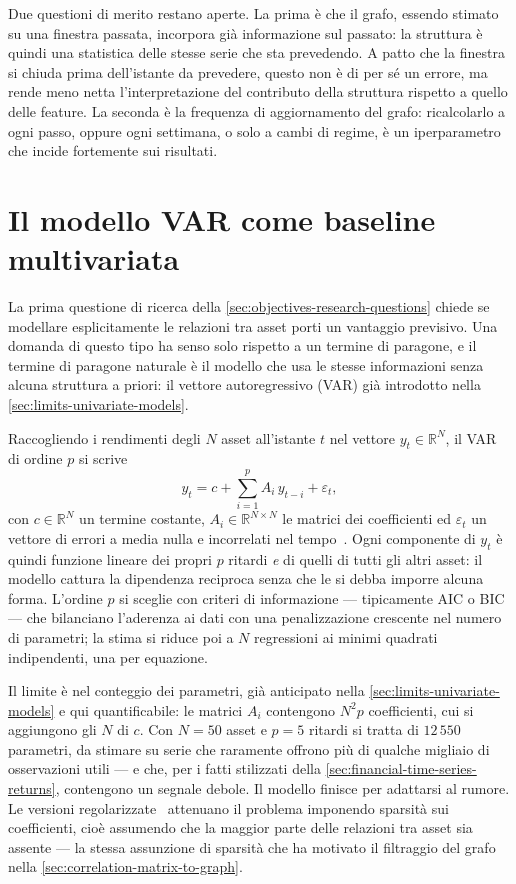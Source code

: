 Due questioni di merito restano aperte. La prima è che il grafo, essendo stimato su una finestra passata, incorpora già informazione sul passato: la struttura è quindi una statistica delle stesse serie che sta prevedendo. A patto che la finestra si chiuda prima dell'istante da prevedere, questo non è di per sé un errore, ma rende meno netta l'interpretazione del contributo della struttura rispetto a quello delle feature. La seconda è la frequenza di aggiornamento del grafo: ricalcolarlo a ogni passo, oppure ogni settimana, o solo a cambi di regime, è un iperparametro che incide fortemente sui risultati.

\section{Il modello VAR come baseline multivariata}
\label{sec:var-baseline}

La prima questione di ricerca della \cref{sec:objectives-research-questions} chiede se modellare esplicitamente le relazioni tra asset porti un vantaggio previsivo. Una domanda di questo tipo ha senso solo rispetto a un termine di paragone, e il termine di paragone naturale è il modello che usa le stesse informazioni senza alcuna struttura a priori: il vettore autoregressivo (VAR) già introdotto nella \cref{sec:limits-univariate-models}.

Raccogliendo i rendimenti degli $N$ asset all'istante $t$ nel vettore $y_t\in\mathbb{R}^N$, il VAR di ordine $p$ si scrive
\begin{equation}
\label{eq:var}
y_t = c + \sum_{i=1}^{p} A_i\,y_{t-i} + \varepsilon_t,
\end{equation}
con $c\in\mathbb{R}^N$ un termine costante, $A_i\in\mathbb{R}^{N\times N}$ le matrici dei coefficienti ed $\varepsilon_t$ un vettore di errori a media nulla e incorrelati nel tempo~\cite{lutkepohl2005new}. Ogni componente di $y_t$ è quindi funzione lineare dei propri $p$ ritardi \emph{e} di quelli di tutti gli altri asset: il modello cattura la dipendenza reciproca senza che le si debba imporre alcuna forma. L'ordine $p$ si sceglie con criteri di informazione — tipicamente AIC o BIC — che bilanciano l'aderenza ai dati con una penalizzazione crescente nel numero di parametri; la stima si riduce poi a $N$ regressioni ai minimi quadrati indipendenti, una per equazione.

Il limite è nel conteggio dei parametri, già anticipato nella \cref{sec:limits-univariate-models} e qui quantificabile: le matrici $A_i$ contengono $N^2p$ coefficienti, cui si aggiungono gli $N$ di $c$. Con $N=50$ asset e $p=5$ ritardi si tratta di $12\,550$ parametri, da stimare su serie che raramente offrono più di qualche migliaio di osservazioni utili — e che, per i fatti stilizzati della \cref{sec:financial-time-series-returns}, contengono un segnale debole. Il modello finisce per adattarsi al rumore. Le versioni regolarizzate~\cite{basu2015regularized} attenuano il problema imponendo sparsità sui coefficienti, cioè assumendo che la maggior parte delle relazioni tra asset sia assente — la stessa assunzione di sparsità che ha motivato il filtraggio del grafo nella \cref{sec:correlation-matrix-to-graph}.

